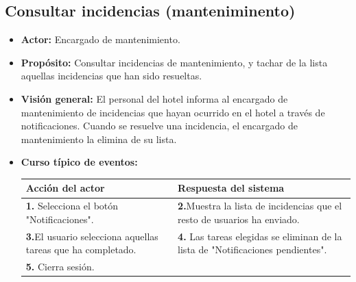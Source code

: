\documentclass[spanish,a4paper,12pt]{report}	%
\begin{document}
		\subsection{Consultar incidencias (manteniminento)}
			\begin{itemize}
			\item \textbf{Actor: }Encargado de mantenimiento.
			\item \textbf{Propósito: }Consultar incidencias de mantenimiento, y tachar de la lista aquellas incidencias que han sido resueltas. 
			\item \textbf{Visión general: }El personal del hotel informa al encargado de mantenimiento de incidencias que hayan ocurrido en el hotel a través de notificaciones. Cuando se resuelve una incidencia, el encargado de mantenimiento la elimina de su lista. 
			\item \textbf{Curso típico de eventos:}\\ 	%
			\begin{tabular}{|p{6cm}||p{6cm}|}
				\hline
				\textbf{Acción del actor} & \textbf{Respuesta del sistema} \\ \hline \hline
				\textbf{1.} Selecciona el botón "Notificaciones". & \textbf{2.}Muestra la lista de incidencias que el resto de usuarios ha enviado.\\ \hline 
				\textbf{3.}El usuario selecciona aquellas tareas que ha completado. & \textbf{4.} Las tareas elegidas se eliminan de la lista de "Notificaciones pendientes".\\ \hline
				\textbf{5.} Cierra sesión. & \\ \hline
			\end{tabular}
		\end {itemize}
		
		
\end{document}

